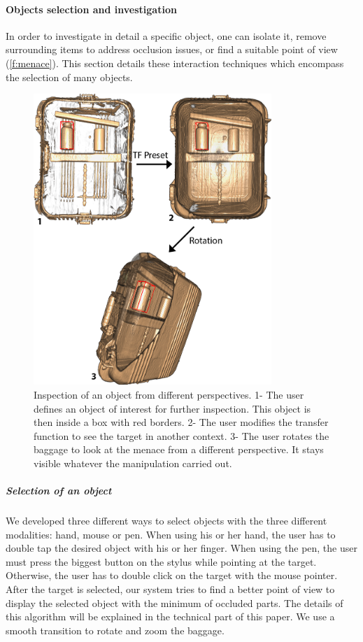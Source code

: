 \paragraph{ Objects selection and investigation}
In order to investigate in detail a specific object, one can isolate it, remove surrounding items to address occlusion issues, or find a suitable point of view (\autoref{f:menace}). This section details these interaction techniques which encompass the selection of  many objects.
\begin{figure}
\centering   
\includegraphics[width=9cm]{Figures/menace.png}
\caption{ Inspection of an object from different perspectives. 1- The user defines an object of interest for further inspection. This object is then inside a box with red borders. 2-  The user modifies the transfer function to see the target in another context. 3- The user rotates the baggage to look at the menace from a different perspective. It stays visible whatever the manipulation carried out.  }
\label{f:menace}
\end{figure} 

\subparagraph{	Selection of an object}
We developed three different ways to select objects with the three different modalities: hand, mouse or pen. When using his or her hand, the user has to double tap the desired object with his or her finger. When using the pen, the user must press the biggest button on the stylus while pointing at the target. Otherwise, the user has to double click on the target with the mouse pointer. After the target is selected, our system tries to find a better point of view to display the selected object with the minimum of occluded parts. The details of this algorithm will be explained in the technical part of this paper. We use a smooth transition to rotate and zoom the baggage. 



